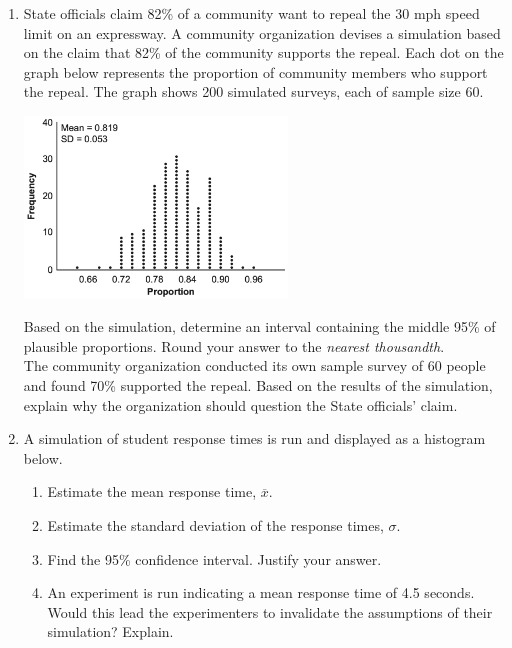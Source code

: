 \documentclass[12pt, twoside]{article}
\begin{document}
\begin{enumerate}
\item State officials claim 82\% of a community want to repeal the 30 mph speed limit on an expressway. A community organization devises a simulation based on the claim that 82\% of the community supports the repeal. Each dot on the graph below represents the proportion of community members who support the repeal. The graph shows 200 simulated surveys, each of sample size 60.
\begin{center}
    \includegraphics*[width=7cm]{../graphics/norm-36-Aug2022.png}
\end{center}
Based on the simulation, determine an interval containing the middle 95\% of plausible proportions. Round your answer to the \emph{nearest thousandth}. \\[0.25cm]
The community organization conducted its own sample survey of 60 people and found 70\% supported the repeal. Based on the results of the simulation, explain why the organization should question the State officials' claim. \vspace{3cm} %


\item A simulation of student response times is run and displayed as a histogram below.
    \begin{center}
    \end{center}
    \begin{enumerate}[itemsep=1.5cm]
        \item Estimate the mean response time, $\overline{x}$.
        \item Estimate the standard deviation of the response times, $\sigma$.
        \item Find the 95\% confidence interval. Justify your answer.
        \item An experiment is run indicating a mean response time of 4.5 seconds. Would this lead the experimenters to invalidate the assumptions of their simulation? Explain.
    \end{enumerate}




\end{enumerate}
\end{document}
